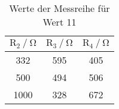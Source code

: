 \begin{table}[H]
  \centering
  \caption{Werte der Messreihe für Wert 11}
  \label{tab:tabe2}
    \begin{tabular}{c c c}
    \toprule
    $ \text{R}_2 \: / \: \si{\ohm} $ & $\text{R}_3 \: / \: \si{\ohm} $ &
    $\text{R}_4 \: / \: \si{\ohm} $ \\
    \midrule
    332 & 595 & 405 \\
    500 & 494 & 506 \\
    1000 & 328 & 672 \\
    \bottomrule
    \end{tabular}
\end{table}
